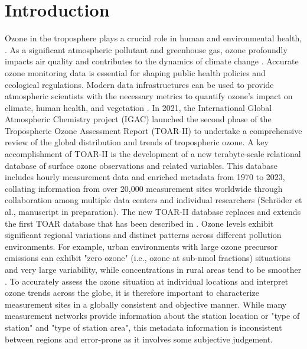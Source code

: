 \documentclass[gmd, manuscript]{copernicus}
\begin{document}
\section{Introduction} 
Ozone in the troposphere plays a crucial role in human and environmental health, \citep{post2012variation, griffiths2021tropospheric}. As a significant atmospheric pollutant and greenhouse gas, ozone profoundly impacts air quality and contributes to the dynamics of climate change  \citep{madronich2023changes, orru2013impact}.
Accurate ozone monitoring data is essential for shaping public health policies and ecological regulations. Modern data infrastructures can be used to provide atmospheric scientists with the necessary metrics to quantify ozone's impact on climate, human health, and vegetation \citep{gaudel2018tropospheric, flemingchapter, mills2018nitrogen, teakles2017impacts, cooper2014global, monks2015tropospheric, schultz2015global}. 
In 2021, the International Global Atmospheric Chemistry project (IGAC) launched the second phase of the Tropospheric Ozone Assessment Report (TOAR-II) to undertake a comprehensive review of the global distribution and trends of tropospheric ozone. A key accomplishment of TOAR-II is the development of a new terabyte-scale relational database of surface ozone observations and related variables. This database includes hourly measurement data and enriched metadata from 1970 to 2023, collating information from over 20,000 measurement sites worldwide through collaboration among multiple data centers and individual researchers (Schröder et al., manuscript in preparation). The new TOAR-II database replaces and extends the first TOAR database that has been described in \cite{schultz2017tropospheric}. 
Ozone levels exhibit significant regional variations and distinct patterns across different pollution environments. For example, urban environments with large ozone precursor emissions can exhibit "zero ozone" (i.e., ozone at sub-nmol fractions) situations and very large variability, while concentrations in rural areas tend to be smoother \citep{zhou2022spatiotemporal, Schultz2017}. To accurately assess the ozone situation at individual locations and interpret ozone trends across the globe, it is therefore important to characterize measurement sites in a globally consistent and objective manner. While many measurement networks provide information about the station location or "type of station" and "type of station area", this metadata information is inconsistent between regions and error-prone as it involves some subjective judgement.
\end{document}
